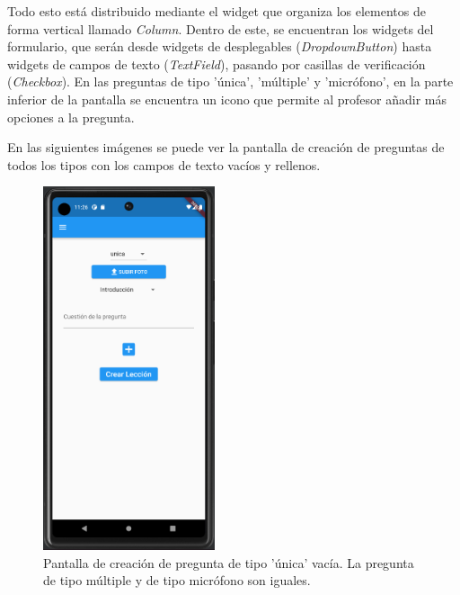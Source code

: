 \newpage
Todo esto está distribuido mediante el widget que organiza los elementos de forma vertical llamado \textit{Column}. 
Dentro de este, se encuentran los widgets del formulario, que serán desde widgets de desplegables (\textit{DropdownButton}) 
hasta widgets de campos de texto (\textit{TextField}), pasando por casillas de verificación (\textit{Checkbox}).
En las preguntas de tipo 'única', 'múltiple' y 'micrófono', en la parte inferior de la pantalla se encuentra un icono que permite al profesor añadir más opciones a la pregunta.

En las siguientes imágenes se puede ver la pantalla de creación de preguntas de todos los tipos con los campos de texto vacíos y rellenos.
\begin{figure}[H]
  \centering
  \includegraphics[width=0.45\textwidth]{imagenes/c7/crearpreguntaunica1.png}
  \caption{Pantalla de creación de pregunta de tipo 'única' vacía. La pregunta de tipo múltiple y de tipo micrófono son iguales.} 
  \label{fig:crearpreguntaunica}
\end{figure}


